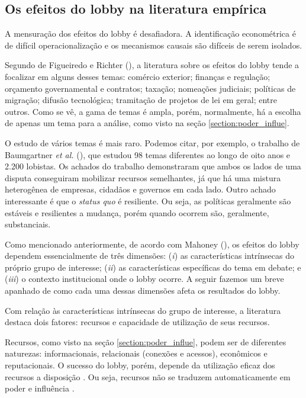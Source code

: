 \subsection{Os efeitos do lobby na literatura empírica}
\label{section:effects}
A mensuração dos efeitos do lobby é desafiadora. A identificação econométrica é de difícil operacionalização e os mecanismos causais são difíceis de serem isolados.

Segundo de Figueiredo e Richter (\citeyear{de_figueiredo_advancing_2014}), a literatura sobre os efeitos do lobby tende a focalizar em alguns desses temas: comércio exterior; finanças e regulação; orçamento governamental e contratos; taxação; nomeações judiciais; políticas de migração; difusão tecnológica; tramitação de projetos de lei em geral; entre outros. Como se vê, a gama de temas é ampla, porém, normalmente, há a escolha de apenas um tema para a análise, como visto na seção \ref{section:poder_influe}. 

O estudo de vários temas é mais raro. Podemos citar, por exemplo, o trabalho de Baumgartner \textit{et al.} (\citeyear{baumgartner2009lobbying}), que estudou 98 temas diferentes ao longo de oito anos e 2.200 lobistas. Os achados do trabalho demonstraram que ambos os lados de uma disputa conseguiram mobilizar recursos semelhantes, já que há uma mistura heterogênea de empresas, cidadãos e governos em cada lado. Outro achado interessante é que o \textit{status quo} é resiliente. Ou seja, as políticas geralmente são estáveis e resilientes a mudança, porém quando ocorrem são, geralmente, substanciais.

Como mencionado anteriormente, de acordo com Mahoney (\citeyear{mahoney_lobbying_2007}), os efeitos do lobby dependem essencialmente de três dimensões: (\textit{i}) as características intrínsecas do próprio grupo de interesse; (\textit{ii}) as características específicas do tema em debate; e (\textit{iii}) o contexto institucional onde o lobby ocorre. A seguir fazemos um breve apanhado de como cada uma dessas dimensões afeta os resultados do lobby.

Com relação às características intrínsecas do grupo de interesse, a literatura destaca dois fatores: recursos e capacidade de utilização de seus recursos.

    Recursos, como visto na seção \ref{section:poder_influe}, podem ser de diferentes naturezas: informacionais, relacionais (conexões e acessos), econômicos e reputacionais. O sucesso do lobby, porém, depende da utilização eficaz dos recursos a disposição \cite{Pop2013Lobbying}. Ou seja, recursos não se traduzem automaticamente em poder e influência \cite{simon_notes_1953}.

